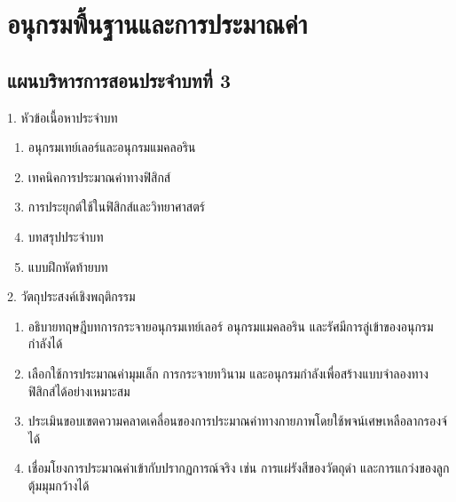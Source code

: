 \chapter{อนุกรมพื้นฐานและการประมาณค่า}

\section*{แผนบริหารการสอนประจำบทที่ 3}

\begin{planbox}[colframe=rbruNavy, colbacktitle=rbruNavy]{1. หัวข้อเนื้อหาประจำบท}
\begin{enumerate}[topsep=2pt, itemsep=1pt, partopsep=0pt, parsep=0pt, leftmargin=1.5em]
    \item อนุกรมเทย์เลอร์และอนุกรมแมคลอริน
    \item เทคนิคการประมาณค่าทางฟิสิกส์
    \item การประยุกต์ใช้ในฟิสิกส์และวิทยาศาสตร์
    \item บทสรุปประจำบท
    \item แบบฝึกหัดท้ายบท
\end{enumerate}
\end{planbox}

\begin{planbox}[colframe=rbruGreen, colbacktitle=rbruGreen]{2. วัตถุประสงค์เชิงพฤติกรรม}
\begin{enumerate}[topsep=2pt, itemsep=1pt, partopsep=0pt, parsep=0pt, leftmargin=1.5em]
    \item อธิบายทฤษฎีบทการกระจายอนุกรมเทย์เลอร์ อนุกรมแมคลอริน และรัศมีการลู่เข้าของอนุกรมกำลังได้
    \item เลือกใช้การประมาณค่ามุมเล็ก การกระจายทวินาม และอนุกรมกำลังเพื่อสร้างแบบจำลองทางฟิสิกส์ได้อย่างเหมาะสม
    \item ประเมินขอบเขตความคลาดเคลื่อนของการประมาณค่าทางกายภาพโดยใช้พจน์เศษเหลือลากรองจ์ได้
    \item เชื่อมโยงการประมาณค่าเข้ากับปรากฏการณ์จริง เช่น การแผ่รังสีของวัตถุดำ และการแกว่งของลูกตุ้มมุมกว้างได้
\end{enumerate}
\end{planbox}

